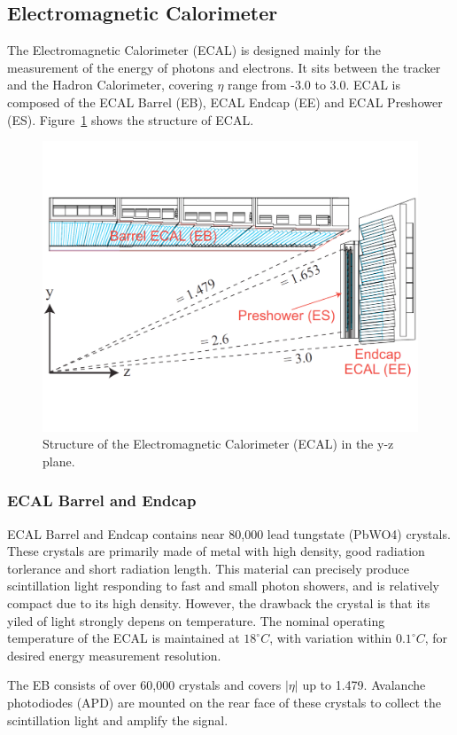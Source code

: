 \subsection{Electromagnetic Calorimeter} 
The Electromagnetic Calorimeter (ECAL)\cite{lhc_ecaldesign} is designed mainly for the measurement of the energy of photons and electrons. It sits between the tracker and the Hadron Calorimeter, covering $\eta$ range from -3.0 to 3.0. ECAL is composed of the ECAL Barrel (EB), ECAL Endcap (EE) and ECAL Preshower (ES). Figure~\ref{fig:lhc_ecal} shows the structure of ECAL.
\begin{figure}[htbp]
\begin{center}
\includegraphics[width=0.7\linewidth]{figures/lhc_ecal.pdf}
\caption{Structure of the Electromagnetic Calorimeter (ECAL) in the y-z plane.}
\label{fig:lhc_ecal}
\end{center}
\end{figure}

\subsubsection{ECAL Barrel and Endcap}
ECAL Barrel and Endcap contains near 80,000 lead tungstate (PbWO4) crystals. These crystals are primarily made of metal with high density, good radiation torlerance and short radiation length. This material can precisely produce scintillation light responding to fast and small photon showers, and is relatively compact due to its high density. However, the drawback the crystal is that its yiled of light strongly depens on temperature. The nominal operating temperature of the ECAL is maintained at $18^{\circ}C$, with variation within $0.1^{\circ}C$, for desired energy measurement resolution. 

\vspace{0.3cm}
The EB consists of over 60,000 crystals and covers $|\eta|$ up to 1.479. Avalanche photodiodes (APD) are mounted on the rear face of these crystals to collect the scintillation light and amplify the signal. 

